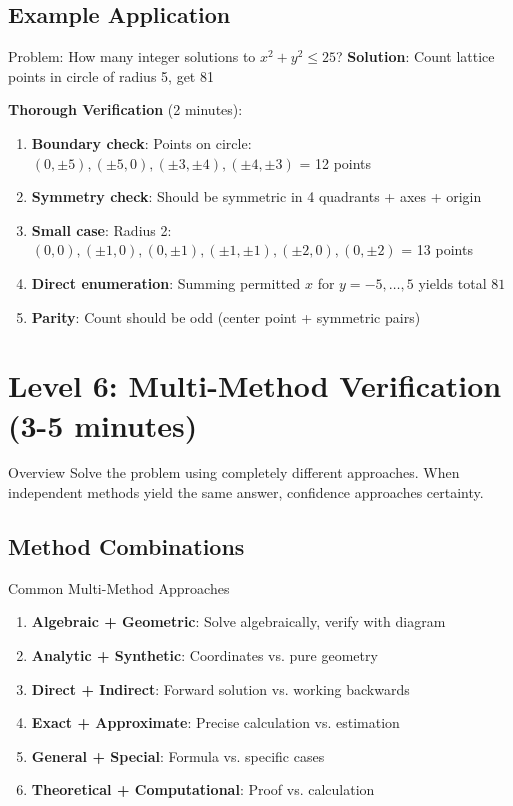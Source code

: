 \documentclass{article}
\begin{document}
\subsection{Example Application}

\begin{thoroughbox}{Problem: How many integer solutions to $x^2 + y^2 \leq 25$?}
\textbf{Solution}: Count lattice points in circle of radius 5, get 81

\textbf{Thorough Verification} (2 minutes):
\begin{enumerate}[nosep]
\item \textbf{Boundary check}: Points on circle: $(0,\pm5), (\pm5,0), (\pm3,\pm4), (\pm4,\pm3)$ = 12 points \checkmark
\item \textbf{Symmetry check}: Should be symmetric in 4 quadrants + axes + origin \checkmark
\item \textbf{Small case}: Radius 2: $(0,0), (\pm1,0), (0,\pm1), (\pm1,\pm1), (\pm2,0), (0,\pm2)$ = 13 points
\item \textbf{Direct enumeration}: Summing permitted $x$ for $y=-5,\ldots,5$ yields total $81$ \checkmark
\item \textbf{Parity}: Count should be odd (center point + symmetric pairs) \checkmark
\end{enumerate}
\end{thoroughbox}

\newpage

\section{Level 6: Multi-Method Verification (3-5 minutes)}

\begin{multimethodbox}{Overview}
Solve the problem using completely different approaches. When independent methods yield the same answer, confidence approaches certainty.
\end{multimethodbox}

\subsection{Method Combinations}

\begin{multimethodbox}{Common Multi-Method Approaches}
\begin{enumerate}
\item \textbf{Algebraic + Geometric}: Solve algebraically, verify with diagram
\item \textbf{Analytic + Synthetic}: Coordinates vs. pure geometry
\item \textbf{Direct + Indirect}: Forward solution vs. working backwards
\item \textbf{Exact + Approximate}: Precise calculation vs. estimation
\item \textbf{General + Special}: Formula vs. specific cases
\item \textbf{Theoretical + Computational}: Proof vs. calculation
\end{enumerate}
\end{multimethodbox}
\end{document}
